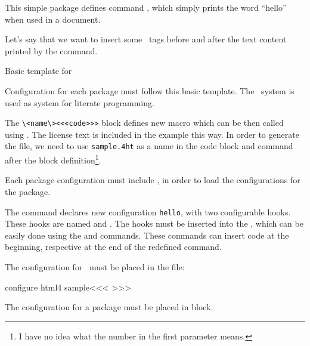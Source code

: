 This simple package defines command \texcommand{\hello}, which simply prints the word \enquote{hello} when used in a document.

Let's say that we want to insert some \HTML\ tags before and after the text content printed by the command.

Basic template for 


Configuration for each package must follow this basic template. The \ProTeX\ system is used as system for literate programming.

The \verb|\<name\><<<code>>>| block defines new macro which can be then called using . The license text
is included in the example this way. In order to generate the  file, we need to use \texttt{sample.4ht} as a name
in the code block and command  after the block definition\footnote{I have no idea what the number
in the first parameter means.}.

Each package configuration  must include , in order to load the configurations for the package.

The command  declares new configuration \texttt{hello}, with two configurable hooks. 
These hooks are named   and . The hooks must be inserted into the 
\texcommand{\hello}, which can be easily done using the  and  commands. These
commands can insert code  at the beginning, respective at the end of the redefined command.

The configuration for \HTML\ must be placed in the  file:


\begin{texsource}
\<configure html4 sample\><<<
>>>
\end{texsource}

The configuration for a package must be placed in  block.


